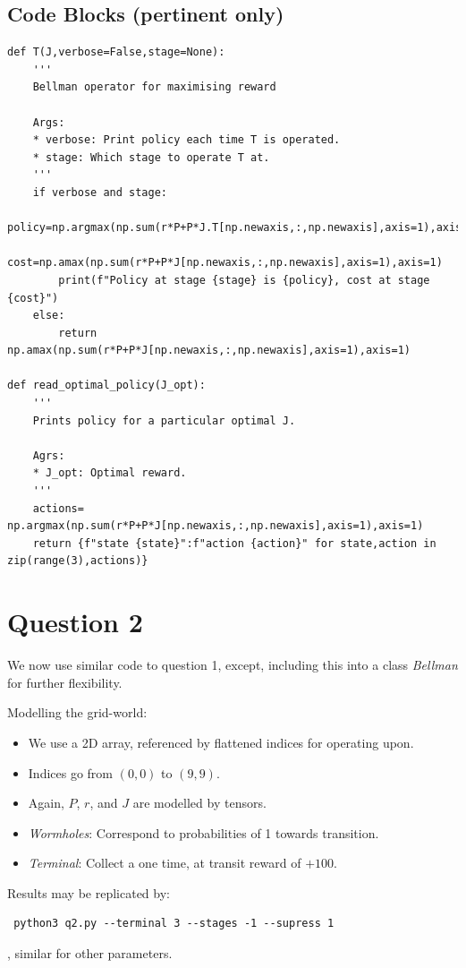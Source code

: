 \subsection {Code Blocks (pertinent only)}
\begin{lstlisting}
def T(J,verbose=False,stage=None):
    '''
    Bellman operator for maximising reward

    Args:
    * verbose: Print policy each time T is operated.
    * stage: Which stage to operate T at.
    '''
    if verbose and stage:
        policy=np.argmax(np.sum(r*P+P*J.T[np.newaxis,:,np.newaxis],axis=1),axis=1)
        cost=np.amax(np.sum(r*P+P*J[np.newaxis,:,np.newaxis],axis=1),axis=1)
        print(f"Policy at stage {stage} is {policy}, cost at stage {cost}")
    else:
        return np.amax(np.sum(r*P+P*J[np.newaxis,:,np.newaxis],axis=1),axis=1)

def read_optimal_policy(J_opt):
    '''
    Prints policy for a particular optimal J.

    Agrs:
    * J_opt: Optimal reward.
    '''
    actions= np.argmax(np.sum(r*P+P*J[np.newaxis,:,np.newaxis],axis=1),axis=1)
    return {f"state {state}":f"action {action}" for state,action in zip(range(3),actions)}
\end{lstlisting}
\bigskip

\section{Question 2}

We now use similar code to question 1, except, including this into a class \textit{Bellman} for further flexibility.

Modelling the grid-world:
\begin{itemize}
\item We use a 2D array, referenced by flattened indices for operating upon.
\item Indices go from $(0,0)$ to $(9,9)$. 
\item Again, $P$, $r$, and $J$ are modelled by tensors.
\item \textit{Wormholes}: Correspond to probabilities of 1 towards transition.
\item \textit{Terminal}: Collect a one time, at transit reward of $+100$. 
\end{itemize}

Results may be replicated by:\\
\begin{lstlisting}
 python3 q2.py --terminal 3 --stages -1 --supress 1
\end{lstlisting}
, similar for other parameters.
